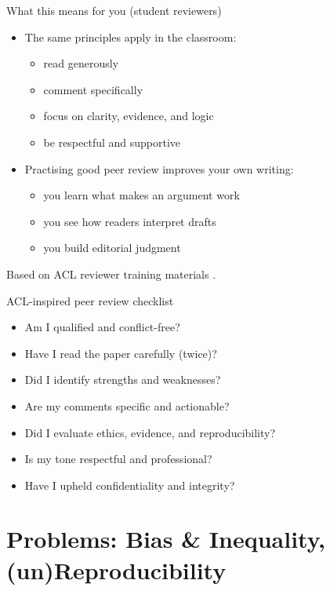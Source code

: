 \documentclass[aspectratio=169]{beamer}
\begin{document}
\begin{frame}{What this means for you (student reviewers)}
\begin{itemize}
  \item The same principles apply in the classroom:
    \begin{itemize}
      \item read generously
      \item comment specifically
      \item focus on clarity, evidence, and logic
      \item be respectful and supportive
    \end{itemize}
  \item Practising good peer review improves your own writing:
    \begin{itemize}
      \item you learn what makes an argument work
      \item you see how readers interpret drafts
      \item you build editorial judgment
    \end{itemize}
\end{itemize}
\medskip
\small  Based on ACL reviewer training materials \citep{acl2023reviewbasics, aclarrguidelines, aclcopr2023}.
\end{frame}


\begin{frame}{ACL-inspired peer review checklist}
\begin{itemize}
  \item Am I qualified and conflict-free?
  \item Have I read the paper carefully (twice)?
  \item Did I identify strengths and weaknesses?
  \item Are my comments specific and actionable?
  \item Did I evaluate ethics, evidence, and reproducibility?
  \item Is my tone respectful and professional?
  \item Have I upheld confidentiality and integrity?
\end{itemize}

\end{frame}


\section{Problems: Bias \& Inequality, (un)Reproducibility}
\end{document}
